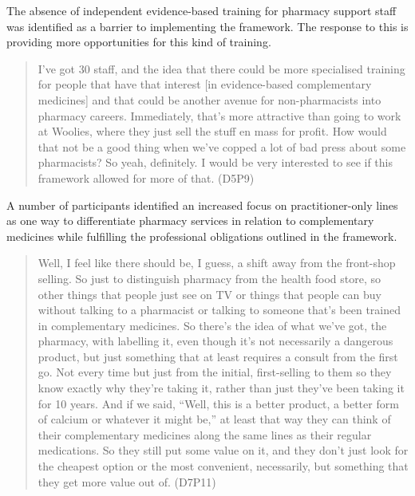 \documentclass[11pt,a4paper]{article}
\begin{document}
The absence of independent evidence-based training for pharmacy support
staff was identified as a barrier to implementing the framework. The
response to this is providing more opportunities for this kind of
training.

\begin{quote}
I've got 30 staff, and the idea that there could be more specialised
training for people that have that interest {[}in evidence-based
complementary medicines{]} and that could be another avenue for
non-pharmacists into pharmacy careers. Immediately, that's more
attractive than going to work at Woolies, where they just sell the stuff
en mass for profit. How would that not be a good thing when we've copped
a lot of bad press about some pharmacists? So yeah, definitely. I would
be very interested to see if this framework allowed for more of that.
(D5P9)
\end{quote}

A number of participants identified an increased focus on
practitioner-only lines as one way to differentiate pharmacy services in
relation to complementary medicines while fulfilling the professional
obligations outlined in the framework.

\begin{quote}
Well, I feel like there should be, I guess, a shift away from the
front-shop selling. So just to distinguish pharmacy from the health food
store, so other things that people just see on TV or things that people
can buy without talking to a pharmacist or talking to someone that's
been trained in complementary medicines. So there's the idea of what
we've got, the pharmacy, with labelling it, even though it's not
necessarily a dangerous product, but just something that at least
requires a consult from the first go. Not every time but just from the
initial, first-selling to them so they know exactly why they're taking
it, rather than just they've been taking it for 10 years. And if we
said, ``Well, this is a better product, a better form of calcium or
whatever it might be,'' at least that way they can think of their
complementary medicines along the same lines as their regular
medications. So they still put some value on it, and they don't just
look for the cheapest option or the most convenient, necessarily, but
something that they get more value out of. (D7P11)
\end{quote}
\end{document}
